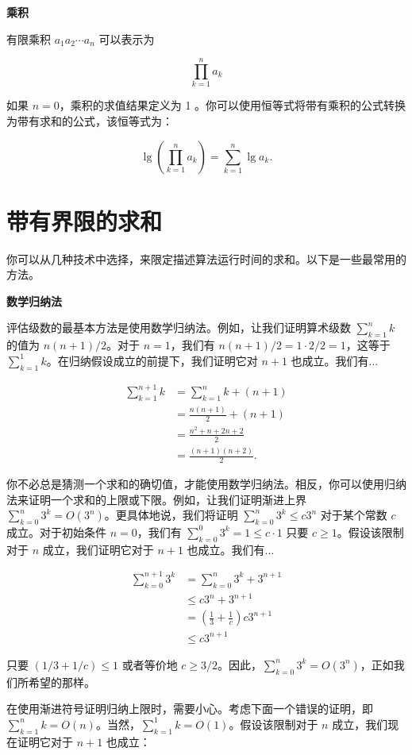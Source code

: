 \documentclass[lang=cn,newtx,10pt,scheme=chinese]{elegantbook}
\begin{document}
\textbf{乘积}

有限乘积 $a_1 a_2 \cdots a_n$ 可以表示为

$$
\prod_{k=1}^n a_k
$$

如果 $n=0$，乘积的求值结果定义为 1 。你可以使用恒等式将带有乘积的公式转换为带有求和的公式，该恒等式为：

$$
\lg (\prod_{k=1}^n a_k)=\sum_{k=1}^n \lg a_k .
$$

\section{带有界限的求和}\label{section:A.2}

你可以从几种技术中选择，来限定描述算法运行时间的求和。以下是一些最常用的方法。

\textbf{数学归纳法}

评估级数的最基本方法是使用数学归纳法。例如，让我们证明算术级数 $\sum_{k=1}^n k$ 的值为 $n(n+1) / 2$。对于 $n=1$，我们有 $n(n+1) / 2=1 \cdot 2 / 2=1$，这等于 $\sum_{k=1}^1 k$。在归纳假设成立的前提下，我们证明它对 $n+1$ 也成立。我们有...

$$
\begin{aligned}
\sum_{k=1}^{n+1} k & =\sum_{k=1}^n k+(n+1) \\
& =\frac{n(n+1)}{2}+(n+1) \\
& =\frac{n^2+n+2 n+2}{2} \\
& =\frac{(n+1)(n+2)}{2} .
\end{aligned}
$$

你不必总是猜测一个求和的确切值，才能使用数学归纳法。相反，你可以使用归纳法来证明一个求和的上限或下限。例如，让我们证明渐进上界 $\sum_{k=0}^n 3^k=O(3^n)$。更具体地说，我们将证明 $\sum_{k=0}^n 3^k \leq c 3^n$ 对于某个常数 $c$ 成立。对于初始条件 $n=0$，我们有 $\sum_{k=0}^0 3^k=1 \leq c \cdot 1$ 只要 $c \geq 1$。假设该限制对于 $n$ 成立，我们证明它对于 $n+1$ 也成立。我们有...

$$
\begin{aligned}
\sum_{k=0}^{n+1} 3^k & =\sum_{k=0}^n 3^k+3^{n+1} \\
& \leq c 3^n+3^{n+1} \\
& =(\frac{1}{3}+\frac{1}{c}) c 3^{n+1} \\
& \leq c 3^{n+1}
\end{aligned}
$$

只要 $(1/3+1/c) \leq 1$ 或者等价地 $c \geq 3 / 2$。因此，$\sum_{k=0}^n 3^k=O(3^n)$，正如我们所希望的那样。

在使用渐进符号证明归纳上限时，需要小心。考虑下面一个错误的证明，即 $\sum_{k=1}^n k=O(n)$。当然，$\sum_{k=1}^1 k=O(1)$。假设该限制对于 $n$ 成立，我们现在证明它对于 $n+1$ 也成立：
\end{document}
